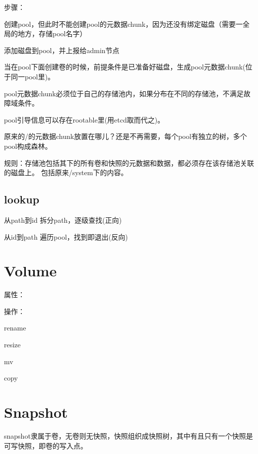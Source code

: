 
步骤：
\begin{enumbox}
\item 创建pool，但此时不能创建pool的元数据chunk，因为还没有绑定磁盘（需要一全局的地方，存储pool名字）
\item 添加磁盘到pool，并上报给admin节点
\item 当在pool下面创建卷的时候，前提条件是已准备好磁盘，生成pool元数据chunk(位于同一pool里)。
\end{enumbox}

pool元数据chunk必须位于自己的存储池内，如果分布在不同的存储池，不满足故障域条件。

pool引导信息可以存在rootable里(用etcd取而代之)。

原来的/的元数据chunk放置在哪儿？还是不再需要，每个pool有独立的树，多个pool构成森林。

规则：存储池包括其下的所有卷和快照的元数据和数据，都必须存在该存储池关联的磁盘上。
包括原来/system下的内容。

\subsection{lookup}

\begin{compactitem}
\item 从path到id 拆分path，逐级查找(正向)
\item 从id到path 遍历pool，找到即退出(反向)
\end{compactitem}

\section{Volume}

属性：

操作：
\begin{compactenum}
\item rename
\item resize 
\item mv
\item copy   %
\end{compactenum}

\section{Snapshot}

snapshot隶属于卷，无卷则无快照，快照组织成快照树，其中有且只有一个快照是可写快照，即卷的写入点。

